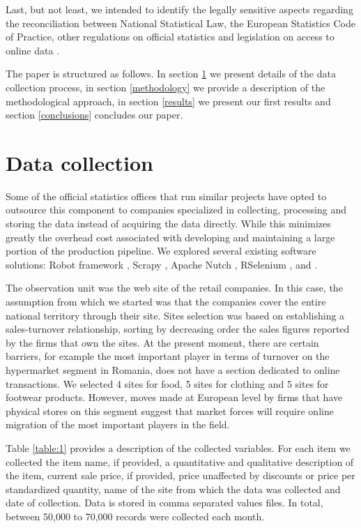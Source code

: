 \documentclass[]{article}
\begin{document}
Last, but not least, we intended to identify the legally sensitive aspects regarding the reconciliation between National Statistical Law, the European Statistics Code of Practice, other regulations on official statistics and legislation on access to online data \cite{swier}.

The paper is structured as follows. In section \ref{section2} we present details of the data collection process, in section \ref{methodology} we provide a description of the methodological approach, in section \ref{results} we present our first results and section \ref{conclusions} concludes our paper.


\section{Data collection}\label{section2}
 
Some of the official statistics offices that run similar projects have opted to outsource this component to companies specialized 
in collecting, processing and storing the data instead of acquiring the data directly. While this minimizes greatly the overhead 
cost associated with developing and maintaining a large portion of the production pipeline. We explored several existing software solutions: 
Robot framework \cite{robot2018}, Scrapy \cite{scrapy1}, \cite{scrapy2} Apache Nutch \cite{nutch}, RSelenium \cite{rs1}, and \cite{rvest}. 

The observation unit was the web site of the retail companies. In this case, the assumption from which we started was 
that the companies cover the entire national territory through their site. Sites selection was based on establishing a 
sales-turnover relationship, sorting by decreasing order the sales figures reported by the firms that own the sites. 
At the present moment, there are certain barriers, for example the most important player in terms of turnover on the 
hypermarket segment in Romania, does not have a section dedicated to online transactions. We selected 4 sites for food, 
5 sites for clothing and 5 sites for footwear products. However, moves made at European level by firms that have physical 
stores on this segment suggest that market forces will require online migration of the most important players in the field.

Table \ref{table:1} provides a description of the collected variables. For each item we collected the item name, if provided, 
a quantitative and qualitative description of the item, current sale price, if provided, price unaffected by discounts or 
price per standardized quantity, name of the site from which the data was collected and date of collection. Data is stored 
in comma separated values files. In total, between 50,000 to 70,000 records were collected each month.
\end{document}
